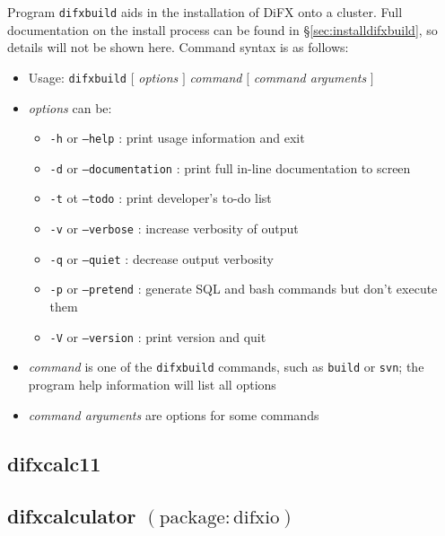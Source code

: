 Program {\tt difxbuild} aids in the installation of DiFX onto a cluster.
Full documentation on the install process can be found in \S\ref{sec:installdifxbuild}, so details will not be shown here.
Command syntax is as follows:

\begin{itemize}
\item[] Usage: {\tt difxbuild} $[$ {\em options} $]$ {\em command} $[$ {\em command arguments} $]$ 
\item[] {\em options} can be:
\begin{itemize}
\item[] {\tt -h} or {\tt --help} : print usage information and exit
\item[] {\tt -d} or {\tt --documentation} : print full in-line documentation to screen
\item[] {\tt -t} ot {\tt --todo} : print developer's to-do list
\item[] {\tt -v} or {\tt --verbose} : increase verbosity of output
\item[] {\tt -q} or {\tt --quiet} : decrease output verbosity
\item[] {\tt -p} or {\tt --pretend} : generate SQL and bash commands but don't execute them
\item[] {\tt -V} or {\tt --version} : print version and quit
\end{itemize}
\item[] {\em command} is one of the {\tt difxbuild} commands, such as {\tt build} or {\tt svn}; the program help information will list all options
\item[] {\em command arguments} are options for some commands
\end{itemize}






\subsection{difxcalc11}





\subsection{difxcalculator {\small $\mathrm{(package: difxio)}$}} \label{sec:difxcalculator}

